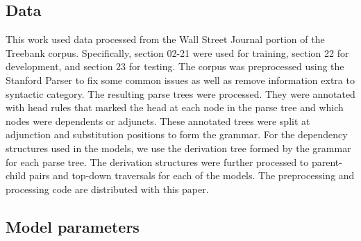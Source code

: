 \documentclass[11pt]{article}
\begin{document}
\subsection{Data}

This work used data processed from the Wall Street Journal portion of the Treebank corpus. Specifically, section 02-21 were used for training, section 22 for development, and section 23 for testing.  The corpus was preprocessed using the Stanford Parser to fix some common issues as well as remove information extra to syntactic category.  The resulting parse trees were processed.  They were annotated with head rules that marked the head at each node in the parse tree and which nodes were dependents or adjuncts.  These annotated trees were split at adjunction and substitution positions to form the grammar.  For the dependency structures used in the models, we use the derivation tree formed by the grammar for each parse tree.  The derivation structures were further processed to parent-child pairs and top-down traversals for each of the models.  The preprocessing and processing code are distributed with this paper. 

\subsection{Model parameters}
\end{document}
